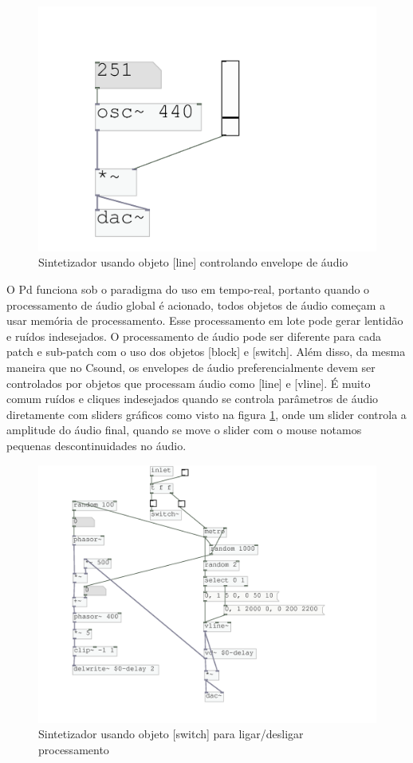 \documentclass{ppgmus}
\begin{document}
\begin{figure}
\includegraphics[scale=.6]{line}
\caption{Sintetizador usando objeto [line] controlando envelope de áudio}
\label{line}
\end{figure}


O Pd funciona sob o paradigma do uso em tempo-real,
portanto quando o processamento de áudio global é acionado, 
todos objetos de áudio começam a usar memória de processamento.
Esse processamento em lote pode gerar lentidão e ruídos indesejados.
O processamento de áudio pode ser diferente para
cada patch e sub-patch com o uso dos objetos [block\texttildelow] e
[switch\texttildelow]. Além disso, da mesma maneira que no Csound, os
envelopes de áudio preferencialmente devem ser controlados
por objetos que processam áudio como [line\texttildelow] e [vline\texttildelow].
É muito comum ruídos e cliques indesejados quando se controla parâmetros
de áudio diretamente com sliders gráficos como visto na figura \ref{line}, onde 
um slider controla a amplitude do áudio final, quando se move o slider com o mouse
notamos pequenas descontinuidades no áudio. 

\begin{figure}
\includegraphics[scale=.6]{switch}
\caption{Sintetizador usando objeto [switch\texttildelow] para ligar/desligar processamento}
\label{switch}
\end{figure}
\end{document}
